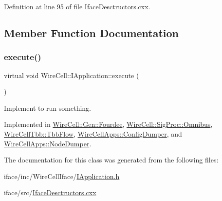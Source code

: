 Definition at line 95 of file Iface\+Desctructors.\+cxx.



\subsection{Member Function Documentation}
\mbox{\label{class_wire_cell_1_1_i_application_a5c77275a37093541aaad6410d8ce5c31}} 
\subsubsection{\texorpdfstring{execute()}{execute()}}
{\footnotesize\ttfamily virtual void Wire\+Cell\+::\+I\+Application\+::execute (\begin{DoxyParamCaption}{ }\end{DoxyParamCaption})\hspace{0.3cm}{\ttfamily [pure virtual]}}



Implement to run something. 



Implemented in \hyperlink{class_wire_cell_1_1_gen_1_1_fourdee_ad7e5725da98e74348a3151e9ddd75cde}{Wire\+Cell\+::\+Gen\+::\+Fourdee}, \hyperlink{class_wire_cell_1_1_sig_proc_1_1_omnibus_ab79548e4b108f011bfc6dd1dae434804}{Wire\+Cell\+::\+Sig\+Proc\+::\+Omnibus}, \hyperlink{class_wire_cell_tbb_1_1_tbb_flow_a2a1da2a872decd5c243bf2fbd832bef6}{Wire\+Cell\+Tbb\+::\+Tbb\+Flow}, \hyperlink{class_wire_cell_apps_1_1_config_dumper_abed84a041f6b72edd82854534667da56}{Wire\+Cell\+Apps\+::\+Config\+Dumper}, and \hyperlink{class_wire_cell_apps_1_1_node_dumper_a43d628cfd19e738b3bb2037ac901fd4b}{Wire\+Cell\+Apps\+::\+Node\+Dumper}.



The documentation for this class was generated from the following files\+:\begin{DoxyCompactItemize}
\item 
iface/inc/\+Wire\+Cell\+Iface/\hyperlink{_i_application_8h}{I\+Application.\+h}\item 
iface/src/\hyperlink{_iface_desctructors_8cxx}{Iface\+Desctructors.\+cxx}\end{DoxyCompactItemize}
